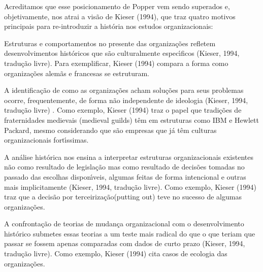 \documentclass[
12pt,		%
openright,	%
twoside,  %
a4paper,			%
chapter=TITLE,		%
english,			%
french,				%
spanish,			%
brazil				%
]{USPSC-classe/USPSC}
\begin{document}
Acreditamos que esse posicionamento de Popper vem sendo superados e, objetivamente, nos atrai a vis\~ao de Kieser (1994), que traz quatro motivos principais para re-introduzir a hist\'oria nos estudos organizacionais:


















\begin{alineas}
\item Estruturas e comportamentos no presente das organiza\c{c}\~oes refletem desenvolvimentos hist\'oricos que s\~ao culturalmente espec\'{\i}ficos  (Kieser, 1994, tradu\c{c}\~ao livre). Para exemplificar,  Kieser (1994) compara a forma como organiza\c{c}\~oes alem\~as e francesas se estruturam.
\item A identifica\c{c}\~ao de como as organiza\c{c}\~oes acham solu\c{c}\~oes para seus problemas ocorre, frequentemente, de forma n\~ao independente de ideologia  (Kieser, 1994, tradu\c{c}\~ao livre) . Como exemplo,  Kieser (1994) traz o papel  que tradi\c{c}\~oes de fraternidades medievais (medieval guilds) t\^em em estruturas como IBM e Hewlett Packard, mesmo considerando que s\~ao empresas que j\'a t\^em culturas organizacionais fort\'{\i}ssimas.
\item A an\'alise hist\'orica nos ensina a interpretar estruturas organizacionais existentes n\~ao como resultado de legisla\c{c}\~ao mas como resultado de decis\~oes tomadas no passado das escolhas dispon\'{\i}veis, algumas feitas de forma intencional e outras mais implicitamente  (Kieser, 1994, tradu\c{c}\~ao livre). Como exemplo,  Kieser (1994) traz que a decis\~ao por \textquotedbl terceiriza\c{c}\~ao\textquotedbl  (putting out) teve no sucesso de algumas organiza\c{c}\~oes.
\item A confronta\c{c}\~ao de teorias de mudan\c{c}a organizacional com o desenvolvimento hist\'orico submetes essas teorias a um teste mais radical do que o que teriam que passar se fossem apenas comparadas com dados de curto prazo (Kieser, 1994, tradu\c{c}\~ao livre). Como exemplo,  Kieser (1994) cita casos de ecologia das organiza\c{c}\~oes.
\end{alineas}
\end{document}
